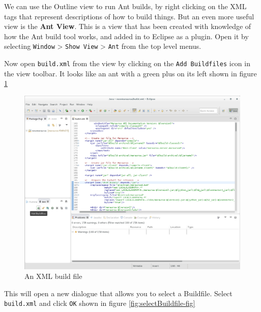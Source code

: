 \documentclass[
]{book}
\begin{document}
We can use the Outline view to run Ant builds, by right clicking on the XML tags that represent descriptions of how to build things. But an even more useful view is the \textbf{Ant View}. This is a view that has been created with knowledge of how the Ant build tool works, and added in to Eclipse as a plugin. Open it by selecting \texttt{Window} \textgreater{} \texttt{Show\ View} \textgreater{} \texttt{Ant} from the top level menus.

Now open \texttt{build.xml} from the view by clicking on the \texttt{Add\ Buildfiles} icon in the view toolbar. It looks like an ant with a green plus on its left shown in figure \ref{fig:antAddBuildfile-fig}

\begin{figure}

{\centering \includegraphics[width=1\linewidth]{images/2.1antAddBuildfile} 

}

\caption{An XML build file}\label{fig:antAddBuildfile-fig}
\end{figure}

This will open a new dialogue that allows you to select a Buildfile. Select \texttt{build.xml} and click \texttt{OK} shown in figure \ref{fig:selectBuildfile-fig}
\end{document}
